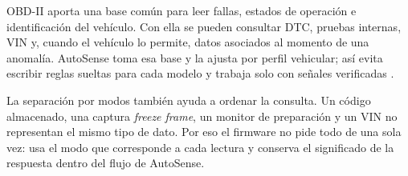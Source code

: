 \documentclass[12pt,letterpaper]{report}
\begin{document}
OBD-II aporta una base común para leer fallas, estados de operación e identificación del vehículo. Con ella se pueden consultar DTC, pruebas internas, VIN y, cuando el vehículo lo permite, datos asociados al momento de una anomalía. AutoSense toma esa base y la ajusta por perfil vehicular; así evita escribir reglas sueltas para cada modelo y trabaja solo con señales verificadas \cite{sae2025_j1979_diagnostic_test_modes,epa2013_obd_readiness_best_practices}.

La separación por modos también ayuda a ordenar la consulta. Un código almacenado, una captura \textit{freeze frame}, un monitor de preparación y un VIN no representan el mismo tipo de dato. Por eso el firmware no pide todo de una sola vez: usa el modo que corresponde a cada lectura y conserva el significado de la respuesta dentro del flujo de AutoSense.
\end{document}

